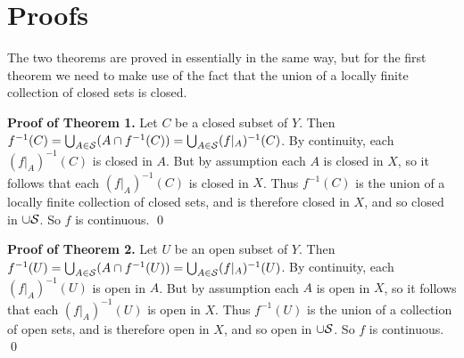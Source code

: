 \documentclass[12pt]{article}
\begin{document}
\section*{Proofs}

The two theorems are proved in essentially in the same way,
but for the first theorem we need to make use of the fact that
the union of a locally finite collection of closed sets is closed.

{\bf Proof of Theorem 1.}
Let $C$ be a closed subset of $Y$.
Then $f^{-1}(C)=\bigcup_{A\in\cal S}(A\cap f^{-1}(C))
=\bigcup_{A\in\cal S}(f|_A)^{-1}(C)$.
By continuity, each $(f|_A)^{-1}(C)$ is closed in $A$.
But by assumption each $A$ is closed in $X$,
so it follows that each $(f|_A)^{-1}(C)$ is closed in $X$.
Thus $f^{-1}(C)$ is the union of a locally finite collection of closed sets,
and is therefore closed in $X$, and so closed in $\cup\cal S$.
So $f$ is continuous.
\qed

{\bf Proof of Theorem 2.}
Let $U$ be an open subset of $Y$.
Then $f^{-1}(U)=\bigcup_{A\in\cal S}(A\cap f^{-1}(U))
=\bigcup_{A\in\cal S}(f|_A)^{-1}(U)$.
By continuity, each $(f|_A)^{-1}(U)$ is open in $A$.
But by assumption each $A$ is open in $X$,
so it follows that each $(f|_A)^{-1}(U)$ is open in $X$.
Thus $f^{-1}(U)$ is the union of a collection of open sets,
and is therefore open in $X$, and so open in $\cup\cal S$.
So $f$ is continuous.
\qed
\end{document}
